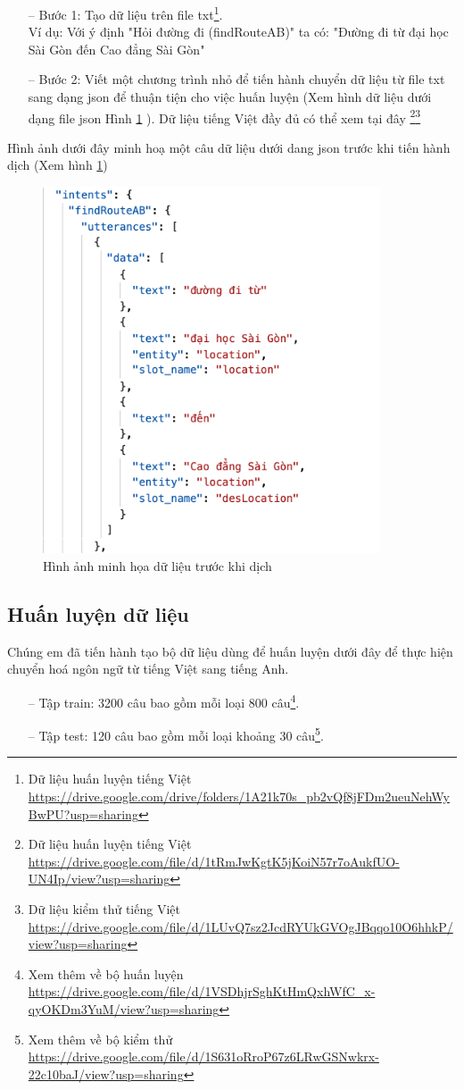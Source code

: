 \begin{itemize}
    \item[--] Bước 1: Tạo dữ liệu trên file txt\footnote{Dữ liệu huấn luyện tiếng Việt \url{https://drive.google.com/drive/folders/1A21k70s_pb2vQf8jFDm2ueuNehWyBwPU?usp=sharing}}. 
    \\Ví dụ: Với ý định "Hỏi đường đi (findRouteAB)" ta có: "Đường đi từ đại học Sài Gòn đến Cao đẳng Sài Gòn"
    \item[--] Bước 2: Viết một chương trình nhỏ để tiến hành chuyển dữ liệu từ file txt sang dạng json để thuận tiện cho việc huấn luyện (Xem hình dữ liệu dưới dạng file json Hình \ref{fig:data-train-json} ). Dữ liệu tiếng Việt đầy đủ có thể xem tại đây \footnote{Dữ liệu huấn luyện tiếng Việt \url{https://drive.google.com/file/d/1tRmJwKgtK5jKoiN57r7oAukfUO-UN4Ip/view?usp=sharing}}\footnote{Dữ liệu kiểm thử tiếng Việt \url{https://drive.google.com/file/d/1LUvQ7sz2JcdRYUkGVOgJBqqo10O6hhkP/view?usp=sharing}}
\end{itemize}
Hình ảnh dưới đây minh hoạ một câu dữ liệu dưới dang json trước khi tiến hành dịch (Xem hình \ref{fig:data-train-json})
\begin{figure}[H]
    \centering
    \includegraphics[width=10cm]{images/Data-train-json.png}
    \caption{Hình ảnh minh họa dữ liệu trước khi dịch}
    \label{fig:data-train-json}
\end{figure}
\subsection{Huấn luyện dữ liệu}
Chúng em đã tiến hành tạo bộ dữ liệu dùng để huấn luyện dưới đây để thực hiện chuyển hoá ngôn ngữ từ tiếng Việt sang tiếng Anh.
\begin{itemize}
    \item[--] Tập train: 3200 câu bao gồm mỗi loại 800 câu\footnote{Xem thêm về bộ huấn luyện \url{https://drive.google.com/file/d/1VSDhjrSghKtHmQxhWfC_x-qyOKDm3YuM/view?usp=sharing}}.
    \item[--] Tập test: 120 câu bao gồm mỗi loại khoảng 30 câu\footnote{Xem thêm về bộ kiểm thử \url{https://drive.google.com/file/d/1S631oRroP67z6LRwGSNwkrx-22c10baJ/view?usp=sharing}}.
\end{itemize}

